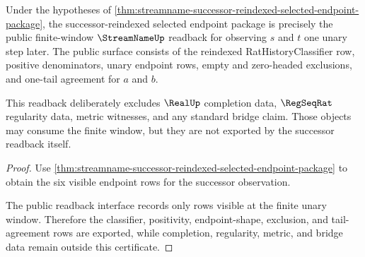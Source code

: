 \begin{theorem}
\label{thm:streamname-successor-reindexed-window-public-readback}
Under the hypotheses of
\autoref{thm:streamname-successor-reindexed-selected-endpoint-package}, the
successor-reindexed selected endpoint package is precisely the public
finite-window $\StreamNameUp$ readback for observing $s$ and $t$ one unary step
later. The public surface consists of the reindexed RatHistoryClassifier row,
positive denominators, unary endpoint rows, empty and zero-headed exclusions,
and one-tail agreement for $a$ and $b$.

This readback deliberately excludes $\RealUp$ completion data,
$\RegSeqRat$ regularity data, metric witnesses, and any standard bridge
claim. Those objects may consume the finite window, but they are not exported
by the successor readback itself.
\end{theorem}
\begin{proof}
Use
\autoref{thm:streamname-successor-reindexed-selected-endpoint-package} to
obtain the six visible endpoint rows for the successor observation.

The public readback interface records only rows visible at the finite unary
window. Therefore the classifier, positivity, endpoint-shape, exclusion, and
tail-agreement rows are exported, while completion, regularity, metric, and
bridge data remain outside this certificate.
\end{proof}


